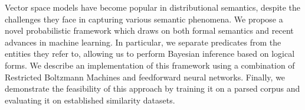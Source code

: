 Vector space models have become popular in distributional semantics, despite the challenges they face in capturing various semantic phenomena. We propose a novel probabilistic framework which draws on both formal semantics and recent advances in machine learning. In particular, we separate predicates from the entities they refer to, allowing us to perform Bayesian inference based on logical forms. We describe an implementation of this framework using a combination of Restricted Boltzmann Machines and feedforward neural networks. Finally, we demonstrate the feasibility of this approach by training it on a parsed corpus and evaluating it on established similarity datasets.
